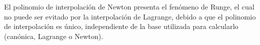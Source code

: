 El polinomio de interpolaci\'on de Newton presenta el fen\'omeno de Runge, el cual no puede ser evitado por la interpolaci\'on de Lagrange, debido a que el polinomio de interpolaci\'on es \'unico, independiente de la base utilizada para calcularlo (can\'onica, Lagrange o Newton).

\hfill{}

